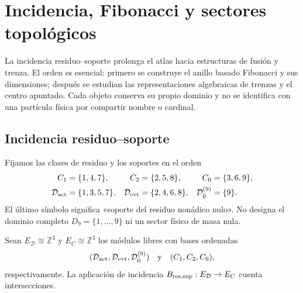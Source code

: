 \chapter[Incidencia y sectores topológicos]{Incidencia, Fibonacci y sectores topológicos}
\label{chap:incidencia-fibonacci-topologia}

La incidencia residuo--soporte prolonga el atlas hacia estructuras de fusión
y trenza. El orden es esencial: primero se construye el anillo basado
Fibonacci y sus dimensiones; después se estudian las representaciones
algebraicas de trenzas y el centro apuntado. Cada objeto conserva su propio
dominio y no se identifica con una partícula física por compartir nombre o
cardinal.

\section{Incidencia residuo--soporte}
\label{sec:incidencia-residuo-soporte}

Fijamos las clases de residuo y los soportes en el orden
\[
 \begin{aligned}
 C_1&=\{1,4,7\},&
 C_2&=\{2,5,8\},&
 C_0&=\{3,6,9\},\\
 \mathcal D_{\rm act}&=\{1,3,5,7\},&
 \mathcal D_{\rm evt}&=\{2,4,6,8\},&
 \mathcal D_{\bar0}^{(9)}&=\{9\}.
 \end{aligned}
\]
El último símbolo significa «soporte del residuo nonádico nulo». No designa
el dominio completo \(D_9=\{1,\ldots,9\}\) ni un sector físico de masa nula.

Sean \(E_{\mathcal D}\cong\mathbb Z^3\) y
\(E_C\cong\mathbb Z^3\) los módulos libres con bases ordenadas
\[
 (\mathcal D_{\rm act},\mathcal D_{\rm evt},
   \mathcal D_{\bar0}^{(9)})
 \quad\text{y}\quad
 (C_1,C_2,C_0),
\]
respectivamente. La aplicación de incidencia
\(B_{\rm res,sup}:E_{\mathcal D}\to E_C\) cuenta intersecciones.

